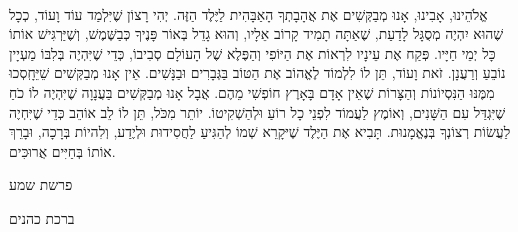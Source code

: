 \documentclass[14pt, article, extrafontsizes, twopage, a4paper]{memoir}
\begin{document}
\\
אֱלֹהֵינוּ, אָבִינוּ,
אָנוּ מְבַקְּשִׁים אֶת אֲהָבָתְךָ הָאַבָּהִית לַיֶּלֶד הַזֶּה.
יְהִי רָצוֹן שֶׁיִּלְמַד עוֹד וָעוֹד,
כְכָל שֶׁהוּא יִהְיֶה מְסֻגָּל לָדַעַת,
שֶׁאַתָּה תָמִיד קָרוֹב אֵלָיו,
וְהוּא גָדֵל בְּאוֹר פָּנֶיךָ כְּבַשֶּׁמֶשׁ,
וְשֶׁיַּרְגִּישׁ אוֹתוֹ כָּל יְמֵי חַיָּיו.
פְּקַח אֶת עֵינָיו לִרְאוֹת אֶת הַיּוֹפִי וְהַפֶּלֶא שֶׁל הָעוֹלָם סְבִיבוֹ,
כְּדֵי שֶׁיִּהְיֶה בְּלִבּוֹ מַעְיָין נוֹבֵעַ וְרַעֲנָן.
זֹאת וָעוֹד,
תֵּן לוֹ לִלְמוֹד לֶאֱהוֹב אֶת הַטּוֹב בַּגְּבָרִים וּבַנָּשִׁים.
אֵין אָנוּ מְבַקְּשִׁים שֵׁיֵּחָֽסְכוּ מִמֶּנּוּ הַנִּסְיוֹנוֹת וְהַצָּרוֹת
שֶׁאֵין אָדָם בָּאָרֶץ חוֹפְשִׁי מֵהֶם.
אֲבָל אָנוּ מְבַקְּשִׁים בַּעֲנָוָה שֶׁיִּהְיֶה לוֹ כֹחַ שֶׁיִּגְדַּל עִם הַשָּׁנִים,
וְאוֹמֶץ לַעֲמוֹד לִפְנֵי כָל רוֹעַ וּלְהַשְׁקִיטוֹ.
יוֹתֵר מִכֹּל, תֵּן לוֹ לֵב אוֹהֵב כְּדֵי שֶׁיִּחְיֶה לַעֲשׂוֹת רְצוֹנְךָ בְּנֶאֱמָנוּת.
תָּבִיא אֶת הַיֶּלֶד שֶׁיּקָרֵא שְׁמוֹ 
לְהַגִּיעַ לַחֲסִידוּת וּלְיֶדַע,
וְלִהיוֹת בְּרָכָה,
וּבָרֵךְ אוֹתוֹ בְּחַיִּים אֲרוּכִּים.

{\centering\larger[2]
  פרשת שמע
  
 ברכת כהנים

}
\end{document}
